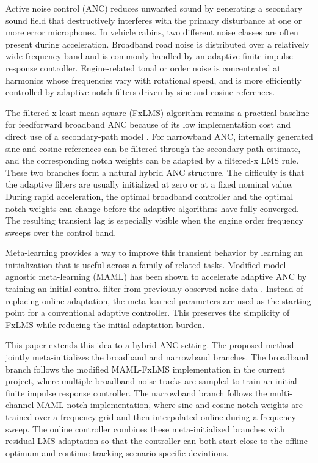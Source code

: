 \documentclass{internoise2026}
\begin{document}
Active noise control (ANC) reduces unwanted sound by generating a secondary sound field that destructively interferes with the primary disturbance at one or more error microphones. In vehicle cabins, two different noise classes are often present during acceleration. Broadband road noise is distributed over a relatively wide frequency band and is commonly handled by an adaptive finite impulse response controller. Engine-related tonal or order noise is concentrated at harmonics whose frequencies vary with rotational speed, and is more efficiently controlled by adaptive notch filters driven by sine and cosine references.

The filtered-x least mean square (FxLMS) algorithm remains a practical baseline for feedforward broadband ANC because of its low implementation cost and direct use of a secondary-path model \cite{widrow1975adaptive,burgess1981active,kuo1996active,elliott2001signal}. For narrowband ANC, internally generated sine and cosine references can be filtered through the secondary-path estimate, and the corresponding notch weights can be adapted by a filtered-x LMS rule. These two branches form a natural hybrid ANC structure. The difficulty is that the adaptive filters are usually initialized at zero or at a fixed nominal value. During rapid acceleration, the optimal broadband controller and the optimal notch weights can change before the adaptive algorithms have fully converged. The resulting transient lag is especially visible when the engine order frequency sweeps over the control band.

Meta-learning provides a way to improve this transient behavior by learning an initialization that is useful across a family of related tasks. Modified model-agnostic meta-learning (MAML) has been shown to accelerate adaptive ANC by training an initial control filter from previously observed noise data \cite{finn2017model,shi2021fast}. Instead of replacing online adaptation, the meta-learned parameters are used as the starting point for a conventional adaptive controller. This preserves the simplicity of FxLMS while reducing the initial adaptation burden.

This paper extends this idea to a hybrid ANC setting. The proposed method jointly meta-initializes the broadband and narrowband branches. The broadband branch follows the modified MAML-FxLMS implementation in the current project, where multiple broadband noise tracks are sampled to train an initial finite impulse response controller. The narrowband branch follows the multi-channel MAML-notch implementation, where sine and cosine notch weights are trained over a frequency grid and then interpolated online during a frequency sweep. The online controller combines these meta-initialized branches with residual LMS adaptation so that the controller can both start close to the offline optimum and continue tracking scenario-specific deviations.
\end{document}
